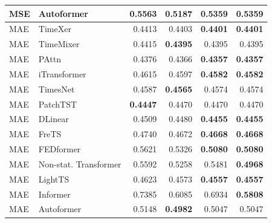 \begin{longtable}{llrrrr}
MSE & Autoformer & 0.5563 & \textbf{0.5187} & 0.5359 & 0.5359 \\
\midrule
MAE & TimeXer & 0.4413 & 0.4403 & \textbf{0.4401} & \textbf{0.4401} \\
MAE & TimeMixer & 0.4415 & \textbf{0.4395} & 0.4395 & 0.4395 \\
MAE & PAttn & 0.4376 & 0.4366 & \textbf{0.4357} & \textbf{0.4357} \\
MAE & iTransformer & 0.4615 & 0.4597 & \textbf{0.4582} & \textbf{0.4582} \\
MAE & TimesNet & 0.4587 & \textbf{0.4565} & 0.4574 & 0.4574 \\
MAE & PatchTST & \textbf{0.4447} & 0.4470 & 0.4470 & 0.4470 \\
MAE & DLinear & 0.4509 & 0.4480 & \textbf{0.4455} & \textbf{0.4455} \\
MAE & FreTS & 0.4740 & 0.4672 & \textbf{0.4668} & \textbf{0.4668} \\
MAE & FEDformer & 0.5621 & 0.5326 & \textbf{0.5080} & \textbf{0.5080} \\
MAE & Non-stat. Transformer & 0.5592 & 0.5258 & 0.5481 & \textbf{0.4968} \\
MAE & LightTS & 0.4623 & 0.4573 & \textbf{0.4557} & \textbf{0.4557} \\
MAE & Informer & 0.7385 & 0.6085 & 0.6934 & \textbf{0.5808} \\
MAE & Autoformer & 0.5148 & \textbf{0.4982} & 0.5047 & 0.5047 \\
\end{longtable}
\endgroup

